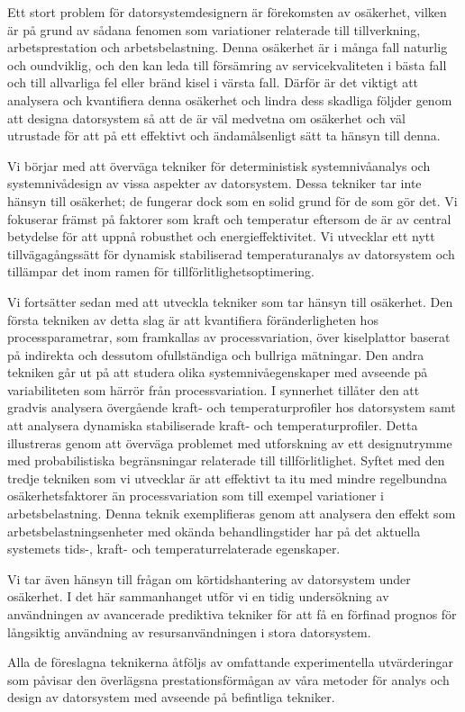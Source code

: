 Ett stort problem för datorsystemdesignern är förekomsten av osäkerhet, vilken
är på grund av sådana fenomen som variationer relaterade till tillverkning,
arbetsprestation och arbetsbelastning. Denna osäkerhet är i många fall naturlig
och oundviklig, och den kan leda till försämring av servicekvaliteten i bästa
fall och till allvarliga fel eller bränd kisel i värsta fall. Därför är det
viktigt att analysera och kvantifiera denna osäkerhet och lindra dess skadliga
följder genom att designa datorsystem så att de är väl medvetna om osäkerhet och
väl utrustade för att på ett effektivt och ändamålsenligt sätt ta hänsyn till
denna.

Vi börjar med att överväga tekniker för deterministisk systemnivåanalys och
systemnivådesign av vissa aspekter av datorsystem. Dessa tekniker tar inte
hänsyn till osäkerhet; de fungerar dock som en solid grund för de som gör det.
Vi fokuserar främst på faktorer som kraft och temperatur eftersom de är av
central betydelse för att uppnå robusthet och energieffektivitet. Vi utvecklar
ett nytt tillvägagångssätt för dynamisk stabiliserad temperaturanalys av
datorsystem och tillämpar det inom ramen för tillförlitlighetsoptimering.

Vi fortsätter sedan med att utveckla tekniker som tar hänsyn till osäkerhet. Den
första tekniken av detta slag är att kvantifiera föränderligheten hos
processparametrar, som framkallas av processvariation, över kiselplattor baserat
på indirekta och dessutom ofullständiga och bullriga mätningar. Den andra
tekniken går ut på att studera olika systemnivåegenskaper med avseende på
variabiliteten som härrör från processvariation. I synnerhet tillåter den att
gradvis analysera övergående kraft- och temperaturprofiler hos datorsystem samt
att analysera dynamiska stabiliserade kraft- och temperaturprofiler. Detta
illustreras genom att överväga problemet med utforskning av ett designutrymme
med probabilistiska begränsningar relaterade till tillförlitlighet. Syftet med
den tredje tekniken som vi utvecklar är att effektivt ta itu med mindre
regelbundna osäkerhetsfaktorer än processvariation som till exempel variationer
i arbetsbelastning. Denna teknik exemplifieras genom att analysera den effekt
som arbetsbelastningsenheter med okända behandlingstider har på det aktuella
systemets tids-, kraft- och temperaturrelaterade egenskaper.

Vi tar även hänsyn till frågan om körtidshantering av datorsystem under
osäkerhet. I det här sammanhanget utför vi en tidig undersökning av användningen
av avancerade prediktiva tekniker för att få en förfinad prognos för långsiktig
användning av resursanvändningen i stora datorsystem.

Alla de föreslagna teknikerna åtföljs av omfattande experimentella utvärderingar
som påvisar den överlägsna prestationsförmågan av våra metoder för analys och
design av datorsystem med avseende på befintliga tekniker.

